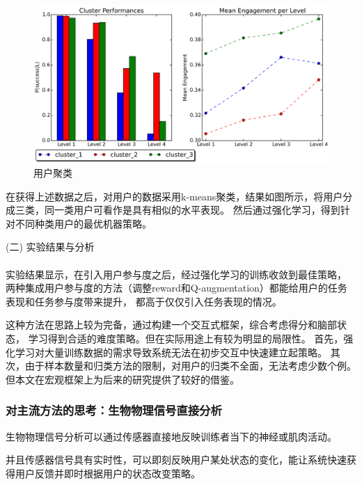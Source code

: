 \documentclass[12pt]{article}
\begin{document}
            \begin{figure}[H]
            	
            	\centering
            	\includegraphics[scale=0.6]{images/user_model.png}
            	\caption{用户聚类\cite{ref17}}
            	\label{fig:label}
            \end{figure}
            在获得上述数据之后，对用户的数据采用k-means聚类，结果如图所示，将用户分成三类，同一类用户可看作是具有相似的水平表现。
            然后通过强化学习，得到针对不同种类用户的最优机器策略。

            (二) 实验结果与分析\paragraph{}
            实验结果显示，在引入用户参与度之后，经过强化学习的训练收敛到最佳策略，
            两种集成用户参与度的方法（调整reward和Q-augmentation）都能给用户的任务表现和任务参与度带来提升，
            都高于仅仅引入任务表现的情况。

            这种方法在思路上较为完备，通过构建一个交互式框架，综合考虑得分和脑部状态，
            学习得到合适的难度策略。但在实际用途上有较为明显的局限性。
            首先，强化学习对大量训练数据的需求导致系统无法在初步交互中快速建立起策略。
            其次，由于样本数量和归类方法的限制，对用户的归类不全面，无法考虑少数个例。
            但本文在宏观框架上为后来的研究提供了较好的借鉴。

            \subsubsection{对主流方法的思考：生物物理信号直接分析}
            生物物理信号分析可以通过传感器直接地反映训练者当下的神经或肌肉活动。

            并且传感器信号具有实时性，可以即刻反映用户某处状态的变化，能让系统快速获得用户反馈并即时根据用户的状态改变策略。
\end{document}
